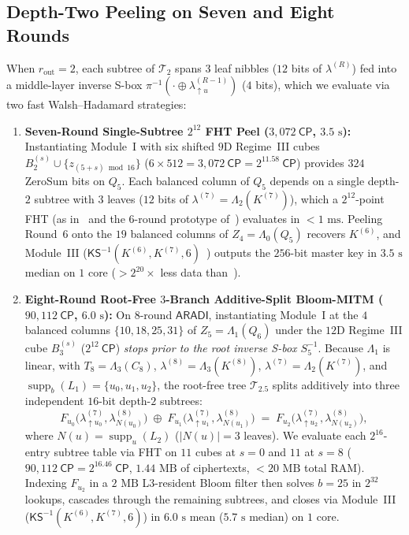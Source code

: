 \documentclass[11pt,a4paper]{article}
\theoremstyle{definition}
\theoremstyle{remark}
\newcommand{\ARADI}{\mathsf{ARADI}}
\newcommand{\supp}{\operatorname{supp}}
\newcommand{\CP}{\mathsf{CP}}
\begin{document}
\subsection{Depth-Two Peeling on Seven and Eight Rounds}
\label{subsec:depth2}

When $r_{\text{out}} = 2$, each subtree of $\mathcal{T}_2$ spans $3$ leaf nibbles ($12$ bits of $\lambda^{(R)}$) fed into a middle-layer inverse S-box $\pi^{-1}(\cdot \oplus \lambda^{(R-1)}_{\uparrow u})$ ($4$ bits), which we evaluate via two fast Walsh--Hadamard strategies:
\begin{enumerate}[leftmargin=1.8em]
    \item \textbf{Seven-Round Single-Subtree $2^{12}$ FHT Peel ($3{,}072~\CP$, $3.5\text{ s}$):} Instantiating Module~I with six shifted $9$D Regime~III cubes $B_2^{(s)} \cup \{z_{(5+s)\bmod 16}\}$ ($6 \times 512 = 3{,}072~\CP = 2^{11.58}~\CP$) provides $324$ ZeroSum bits on $Q_5$. Each balanced column of $Q_5$ depends on a single depth-$2$ subtree with $3$ leaves ($12$ bits of $\lambda^{(7)} = \Lambda_2(K^{(7)})$), which a $2^{12}$-point FHT (as in~\cite{TA14} and the $6$-round prototype of~\cite{DG25}) evaluates in $<1\text{ ms}$. Peeling Round~$6$ onto the $19$ balanced columns of $Z_4 = \Lambda_0(Q_5)$ recovers $K^{(6)}$, and Module~III ($\mathsf{KS}^{-1}(K^{(6)}, K^{(7)}, 6)$~\cite[Remark~5]{DG25}) outputs the $256$-bit master key in $3.5\text{ s}$ median on $1$ core ($>2^{20}\times$ less data than~\cite{BBGHP25}).
    \item \textbf{Eight-Round Root-Free $3$-Branch Additive-Split Bloom-MITM ($90{,}112~\CP$, $6.0\text{ s}$):} On $8$-round $\ARADI$, instantiating Module~I at the $4$ balanced columns $\{10, 18, 25, 31\}$ of $Z_5 = \Lambda_1(Q_6)$ under the $12$D Regime~III cube $B_3^{(s)}$ ($2^{12}~\CP$) \emph{stops prior to the root inverse S-box $S_5^{-1}$}. Because $\Lambda_1$ is linear, with $T_8 = \Lambda_3(C_8)$, $\lambda^{(8)} = \Lambda_3(K^{(8)})$, $\lambda^{(7)} = \Lambda_2(K^{(7)})$, and $\supp_b(L_1) = \{u_0, u_1, u_2\}$, the root-free tree $\mathcal{T}_{2.5}$ splits additively into three independent $16$-bit depth-$2$ subtrees:
    \[
    F_{u_0}\!\bigl(\lambda^{(7)}_{\uparrow u_0}, \lambda^{(8)}_{N(u_0)}\bigr) \;\oplus\;
    F_{u_1}\!\bigl(\lambda^{(7)}_{\uparrow u_1}, \lambda^{(8)}_{N(u_1)}\bigr) \;=\;
    F_{u_2}\!\bigl(\lambda^{(7)}_{\uparrow u_2}, \lambda^{(8)}_{N(u_2)}\bigr),
    \]
    where $N(u) = \supp_u(L_2)$ ($|N(u)| = 3$ leaves). We evaluate each $2^{16}$-entry subtree table via FHT on $11$ cubes at $s = 0$ and $11$ at $s = 8$ ($90{,}112~\CP = 2^{16.46}~\CP$, $1.44\text{ MB}$ of ciphertexts, $<20\text{ MB}$ total RAM). Indexing $F_{u_2}$ in a $2\text{ MB}$ L3-resident Bloom filter then solves $b = 25$ in $2^{32}$ lookups, cascades through the remaining subtrees, and closes via Module~III ($\mathsf{KS}^{-1}(K^{(6)}, K^{(7)}, 6)$) in $6.0\text{ s}$ mean ($5.7\text{ s}$ median) on $1$ core.
\end{enumerate}
\end{document}
